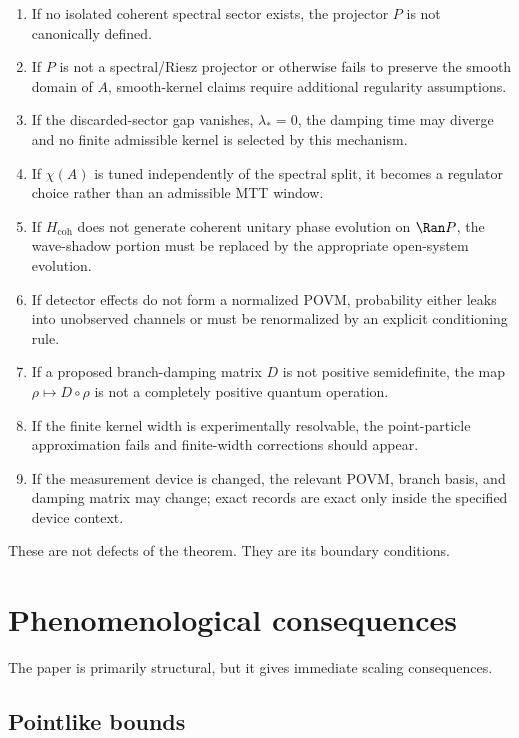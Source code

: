 \documentclass[11pt]{article}
\newcommand{\coh}{\mathrm{coh}}
\begin{document}
\begin{enumerate}[label=(\roman*)]
  \item If no isolated coherent spectral sector exists, the projector \(P\) is not canonically
  defined.
  \item If \(P\) is not a spectral/Riesz projector or otherwise fails to preserve the smooth
  domain of \(A\), smooth-kernel claims require additional regularity assumptions.
  \item If the discarded-sector gap vanishes, \(\lambda_\ast=0\), the damping time may diverge
  and no finite admissible kernel is selected by this mechanism.
  \item If \(\chi(A)\) is tuned independently of the spectral split, it becomes a regulator choice
  rather than an admissible MTT window.
  \item If \(H_{\coh}\) does not generate coherent unitary phase evolution on \(\Ran P\), the
  wave-shadow portion must be replaced by the appropriate open-system evolution.
  \item If detector effects do not form a normalized POVM, probability either leaks into
  unobserved channels or must be renormalized by an explicit conditioning rule.
  \item If a proposed branch-damping matrix \(D\) is not positive semidefinite, the map
  \(\rho\mapsto D\circ\rho\) is not a completely positive quantum operation.
  \item If the finite kernel width is experimentally resolvable, the point-particle approximation
  fails and finite-width corrections should appear.
  \item If the measurement device is changed, the relevant POVM, branch basis, and damping
  matrix may change; exact records are exact only inside the specified device context.
\end{enumerate}

These are not defects of the theorem. They are its boundary conditions.

\section{Phenomenological consequences}

The paper is primarily structural, but it gives immediate scaling consequences.

\subsection{Pointlike bounds}
\end{document}
